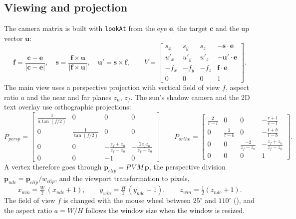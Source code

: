 \subsection{Viewing and projection}
The camera matrix is built with \texttt{lookAt} from the eye $\mathbf{e}$, the target $\mathbf{c}$ and the up
vector $\mathbf{u}$:
\[
\mathbf{f}=\frac{\mathbf{c}-\mathbf{e}}{|\mathbf{c}-\mathbf{e}|},\quad
\mathbf{s}=\frac{\mathbf{f}\times\mathbf{u}}{|\mathbf{f}\times\mathbf{u}|},\quad
\mathbf{u}'=\mathbf{s}\times\mathbf{f},\qquad
V=\begin{bmatrix} s_x&s_y&s_z&-\mathbf{s}\cdot\mathbf{e}\\ u'_x&u'_y&u'_z&-\mathbf{u}'\cdot\mathbf{e}\\ -f_x&-f_y&-f_z&\mathbf{f}\cdot\mathbf{e}\\0&0&0&1\end{bmatrix}.
\]
The main view uses a perspective projection with vertical field of view $f$, aspect ratio $a$ and the
near and far planes $z_n$, $z_f$. The sun's shadow camera and the 2D text overlay use orthographic
projections:
\[
P_{persp} = \begin{bmatrix}\frac{1}{a\tan(f/2)}&0&0&0\\0&\frac{1}{\tan(f/2)}&0&0\\0&0&-\frac{z_f+z_n}{z_f-z_n}&-\frac{2z_fz_n}{z_f-z_n}\\0&0&-1&0\end{bmatrix}
\qquad
P_{ortho} = \begin{bmatrix}\frac{2}{r-l}&0&0&-\frac{r+l}{r-l}\\0&\frac{2}{t-b}&0&-\frac{t+b}{t-b}\\0&0&\frac{-2}{z_f-z_n}&-\frac{z_f+z_n}{z_f-z_n}\\0&0&0&1\end{bmatrix}.
\]
A vertex therefore goes through $\mathbf{p}_{clip}=P\,V\,M\,\mathbf{p}$, the perspective division
$\mathbf{p}_{ndc}=\mathbf{p}_{clip}/w_{clip}$, and the viewport transformation to pixels,
\[
x_{win} = \tfrac{W}{2}\,(x_{ndc}+1),\qquad y_{win}=\tfrac{H}{2}\,(y_{ndc}+1),\qquad z_{win}=\tfrac12(z_{ndc}+1).
\]
The field of view $f$ is changed with the mouse wheel between $25^\circ$ and $110^\circ$ (),
and the aspect ratio $a=W/H$ follows the window size when the window is resized.
